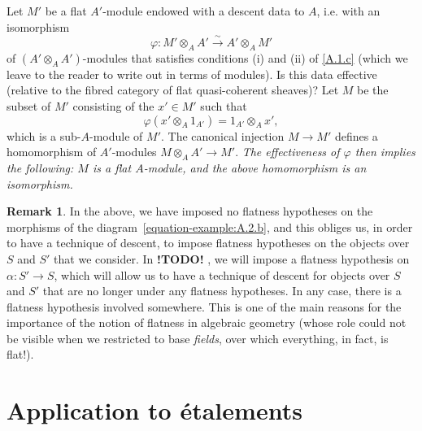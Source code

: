 \documentclass{article}
\theoremstyle{plain}
\theoremstyle{definition}
\newtheorem*{remark}{Remark}
\newcommand{\todo}{\textbf{ !TODO! }}
\newcommand{\oldpage}[1]{\marginpar{\footnotesize$\Big\vert$ \textit{p.~#1}}}
\begin{document}
Let $M'$ be a flat $A'$-module endowed with a descent data to $A$, i.e. with an isomorphism
\[
  \varphi\colon M'\otimes_A A' \xrightarrow{\sim} A'\otimes_A M'
\]
of $(A'\otimes_A A')$-modules that satisfies conditions (i) and (ii) of \cref{A.1.c} (which we leave to the reader to write out in terms of modules).
Is this data effective (relative to the fibred category of flat quasi-coherent sheaves)?
Let $M$ be the subset of $M'$ consisting of the $x'\in M'$ such that
\[
  \varphi(x'\otimes_A 1_{A'}) = 1_{A'}\otimes_A x',
\]
which is a sub-$A$-module of $M'$.
The canonical injection $M\to M'$ defines a homomorphism of $A'$-modules $M\otimes_A A'\to M'$.
\emph{The effectiveness of $\varphi$ then implies the following: $M$ is a flat $A$-module, and the above homomorphism is an isomorphism.}

\begin{remark}
  In the above, we have imposed no flatness hypotheses on the morphisms of the diagram~\cref{equation-example:A.2.b}, and this obliges us, in order to have a technique of descent, to impose flatness hypotheses on the objects over $S$ and $S'$ that we consider.
  In \todo, we will impose a flatness hypothesis on $\alpha\colon S'\to S$, which will allow us to have a technique of descent for objects over $S$ and $S'$ that are no longer under any flatness hypotheses.
  In any case, there is a flatness hypothesis involved somewhere.
  This is one of the main reasons for the importance of the notion of flatness in algebraic geometry (whose role could not be visible when we restricted to base \emph{fields}, over which everything, in fact, is flat!).
\end{remark}


\oldpage{190-10}
\section{Application to \'{e}talements}
\label{A.3}
\end{document}
